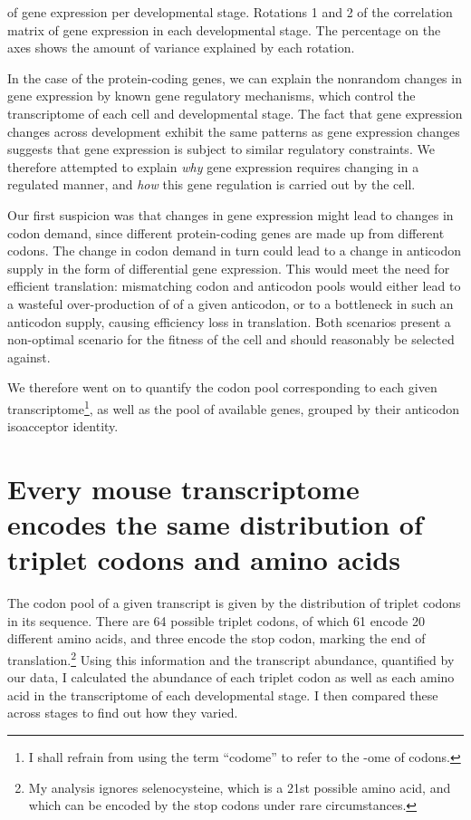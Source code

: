     {\pca of \trna gene expression per developmental stage.}
    {Rotations \num{1} and \num{2} of the correlation matrix of
    \trna gene expression in each developmental stage. The percentage on the
    axes shows the amount of variance explained by each rotation.}

In the case of the protein-coding genes, we can explain the nonrandom changes in
gene expression by known gene regulatory mechanisms, which control the
transcriptome of each cell and developmental stage. The fact that \trna gene
expression changes across development exhibit the same patterns as \mrna gene
expression changes suggests that \trna gene expression is subject to similar
regulatory constraints. We therefore attempted to explain \emph{why} \trna gene
expression requires changing in a regulated manner, and \emph{how} this \trna
gene regulation is carried out by the cell.

Our first suspicion was that changes in \mrna gene expression might lead to
changes in codon demand, since different protein-coding genes are made up from
different codons. The change in codon demand in turn could lead to a change in
anticodon supply in the form of differential \trna gene expression. This would
meet the need for efficient translation: mismatching codon and anticodon pools
would either lead to a wasteful over-production of \trna[s] of a given
anticodon, or to a bottleneck in such an anticodon supply, causing efficiency
loss in translation. Both scenarios present a non-optimal scenario for the
fitness of the cell and should reasonably be selected against.

We therefore went on to quantify the codon pool corresponding to each given
transcriptome\footnote{I shall refrain from using the term “codome” to refer to
the -ome of codons.}, as well as the pool of available \trna genes, grouped by
their anticodon isoacceptor identity.

\section{Every mouse \mrna transcriptome encodes the same distribution of
triplet codons and amino acids}

The codon pool of a given \mrna transcript is given by the distribution of
triplet codons in its sequence. There are 64 possible triplet codons, of which
61 encode 20 different amino acids, and three encode the stop codon, marking the
end of translation.\footnote{My analysis ignores selenocysteine, which is a
\num{21}st possible amino acid, and which can be encoded by the stop codons
 under rare circumstances.} Using this information and the transcript
abundance, quantified by our \rnaseq data, I calculated the abundance of each
triplet codon as well as each amino acid in the transcriptome of each
developmental stage. I then compared these across stages to find out how they
varied.


